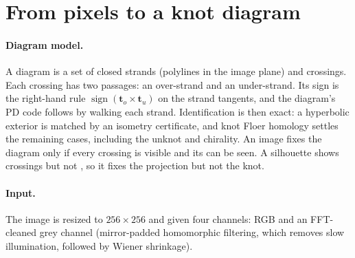 \section{From pixels to a knot diagram}\label{sec:method}

\paragraph{Diagram model.} A diagram is a set of closed strands (polylines in the
image plane) and crossings. Each crossing has two passages: an over-strand and an
under-strand. Its sign is the right-hand rule $\operatorname{sign}(\mathbf{t}_o\times\mathbf{t}_u)$
on the strand tangents, and the diagram's PD code follows by walking each strand.
Identification is then exact: a hyperbolic exterior is matched by an isometry
certificate, and knot Floer homology settles the remaining cases, including the
unknot and chirality. An image fixes the diagram only if every crossing is visible
and its \ou{} can be seen. A silhouette shows crossings but not \ou{}, so it fixes
the projection but not the knot.

\paragraph{Input.} The image is resized to $256\times256$ and given four channels:
RGB and an FFT-cleaned grey channel (mirror-padded homomorphic filtering, which
removes slow illumination, followed by Wiener shrinkage).


